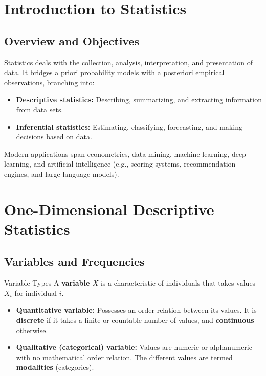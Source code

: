 \documentclass[11pt, a4paper]{article}
\begin{document}
\section{Introduction to Statistics}

\subsection{Overview and Objectives}
Statistics deals with the collection, analysis, interpretation, and presentation of data. It bridges a priori probability models with a posteriori empirical observations, branching into:
\begin{itemize}
    \item \textbf{Descriptive statistics:} Describing, summarizing, and extracting information from data sets.
    \item \textbf{Inferential statistics:} Estimating, classifying, forecasting, and making decisions based on data.
\end{itemize}
Modern applications span econometrics, data mining, machine learning, deep learning, and artificial intelligence (e.g., scoring systems, recommendation engines, and large language models).

\section{One-Dimensional Descriptive Statistics}

\subsection{Variables and Frequencies}

\begin{definition}{Variable Types}{}
A \textbf{variable $X$} is a characteristic of individuals that takes values $X_i$ for individual $i$.
\begin{itemize}
    \item \textbf{Quantitative variable:} Possesses an order relation between its values. It is \textbf{discrete} if it takes a finite or countable number of values, and \textbf{continuous} otherwise.
    \item \textbf{Qualitative (categorical) variable:} Values are numeric or alphanumeric with no mathematical order relation. The different values are termed \textbf{modalities} (categories).
\end{itemize}
\end{definition}
\end{document}
